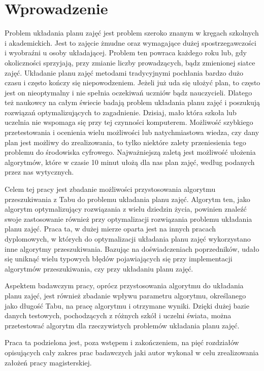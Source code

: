 \chapter{Wprowadzenie}


Problem układania planu zajęć jest problem szeroko znanym w kręgach szkolnych i akademickich. Jest to zajęcie żmudne oraz wymagające dużej spostrzegawczości i wyobraźni u osoby układającej. Problem ten powraca każdego roku lub, gdy okoliczności sprzyjają, przy zmianie liczby prowadzących, bądz zmienionej siatce zajęć. Układanie planu zajęć metodami tradycyjnymi pochłania bardzo dużo czasu i często kończy się niepowodzeniem. Jeżeli już uda się ułożyć plan, to często jest on nieoptymalny i nie spełnia oczekiwań uczniów bądz nauczycieli. Dlatego też naukowcy na całym świecie badają problem układania planu zajęć i poszukują rozwiązań optymalizujących to zagadnienie. Dzisiaj, mało która szkoła lub uczelnia nie wspomaga się przy tej czynności komputerem. Możliwość szybkiego przetestowania i ocenienia wielu możliwości lub natychmiastowa wiedza, czy dany plan jest możliwy do zrealizowania, to tylko niektóre zalety przeniesienia tego problemu do środowiska cyfrowego. Najważniejszą zaletą jest możliwość ułożenia algorytmów, które w czasie 10 minut ułożą dla nas plan zajęć, według podanych przez nas wytycznych.

Celem tej pracy jest zbadanie możliwości przystosowania algorytmu przeszukiwania z Tabu do problemu układania planu zajęć. Algorytm ten, jako algorytm optymalizujący rozwiązania z wielu dziedzin życia, powinien znaleźć swoje zastosowanie również przy optymalizacji rozwiązania problemu układania planu zajęć. Praca ta, w dużej mierze oparta jest na innych pracach dyplomowych, w których do optymalizacji układania planu zajęć wykorzystano inne algorytmy przeszukiwania. Bazując na doświadczeniach poprzedników, udało się uniknąć wielu typowych błędów pojawiających się przy implementacji algorytmów przeszukiwania, czy przy układaniu planu zajęć.

Aspektem badawczym pracy, oprócz przystosowania algorytmu do układania planu zajęć, jest również zbadanie wpływu parametru algorytmu, określanego jako długość Tabu, na pracę algorytmu i otrzymane wyniki. Dzięki dużej bazie danych testowych, pochodzących z różnych szkół i uczelni świata, można przetestować algorytm dla rzeczywistych problemów układania planu zajęć.

Praca ta podzielona jest, poza wstępem i zakończeniem, na pięć rozdziałów opisujących cały zakres prac badawczych jaki autor wykonał w celu zrealizowania założeń pracy magisterskiej. 

